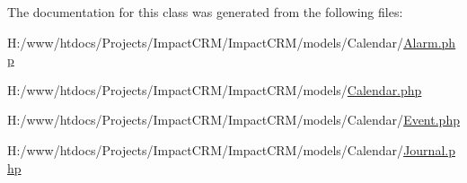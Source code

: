 The documentation for this class was generated from the following files:\begin{DoxyCompactItemize}
\item 
H:/www/htdocs/Projects/ImpactCRM/ImpactCRM/models/Calendar/\hyperlink{Alarm_8php}{Alarm.php}\item 
H:/www/htdocs/Projects/ImpactCRM/ImpactCRM/models/\hyperlink{Calendar_8php}{Calendar.php}\item 
H:/www/htdocs/Projects/ImpactCRM/ImpactCRM/models/Calendar/\hyperlink{Event_8php}{Event.php}\item 
H:/www/htdocs/Projects/ImpactCRM/ImpactCRM/models/Calendar/\hyperlink{Journal_8php}{Journal.php}\end{DoxyCompactItemize}
